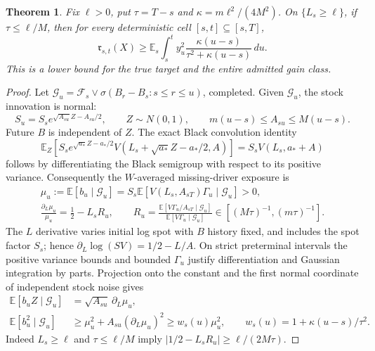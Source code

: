 \documentclass[11pt,a4paper]{amsart}
\theoremstyle{plain}
\newtheorem{theorem}{Theorem}[section]
\theoremstyle{definition}
\theoremstyle{remark}
\newcommand{\EE}{\mathbb{E}}
\newcommand{\F}{\mathcal F}
\newcommand{\G}{\mathcal G}
\newcommand{\Es}{\EE_s}
\begin{document}
\begin{theorem}\label{thm:direct}
Fix $\ell>0$, put $\tau=T-s$ and $\kappa=m\ell^2/(4M^2)$. On $\{L_s\ge\ell\}$, if $\tau\le\ell/M$, then for every deterministic cell $[s,t]\subseteq[s,T]$,
\begin{equation}\label{eq:direct-coercivity}
 \mathfrak r_{s,t}(X)\ge
 \Es\int_s^t y_u^2\frac{\kappa(u-s)}{\tau^2+\kappa(u-s)}\,du.
\end{equation}
This is a lower bound for the true target and the entire admitted gain class.
\end{theorem}
\begin{proof}
Let $\G_u=\F_s\vee\sigma(B_r-B_s:s\le r\le u)$, completed. Given $\G_u$, the stock innovation is normal:
\[
 S_u=S_s e^{\sqrt{A_{su}}Z-A_{su}/2},\qquad Z\sim N(0,1),
 \qquad m(u-s)\le A_{su}\le M(u-s).
\]
Future $B$ is independent of $Z$. The exact Black convolution identity
\begin{equation}\label{eq:black-semigroup}
 \EE_Z\!\left[S_s e^{\sqrt{a_*}Z-a_*/2}
 V(L_s+\sqrt{a_*}Z-a_*/2,A)\right]=S_sV(L_s,a_*+A)
\end{equation}
follows by differentiating the Black semigroup with respect to its positive variance. Consequently the $W$-averaged missing-driver exposure is
\begin{equation}\label{eq:mu-logderivative}
 \begin{gathered}
 \mu_u:=\EE[b_u\mid\G_u]
   =S_s\EE[V(L_s,A_{sT})\Gamma_u\mid\G_u]>0,\\
 \frac{\partial_L\mu_u}{\mu_u}=\tfrac12-L_sR_u,
 \qquad
 R_u=\frac{\EE[V\Gamma_u/A_{sT}\mid\G_u]}{
                  \EE[V\Gamma_u\mid\G_u]}
       \in[(M\tau)^{-1},(m\tau)^{-1}].
 \end{gathered}
\end{equation}
The $L$ derivative varies initial log spot with $B$ history fixed, and includes the spot factor $S_s$; hence $\partial_L\log(SV)=1/2-L/A$. On strict preterminal intervals the positive variance bounds and bounded $\Gamma_u$ justify differentiation and Gaussian integration by parts. Projection onto the constant and the first normal coordinate of independent stock noise gives
\begin{align*}
 \EE[b_uZ\mid\G_u]&=\sqrt{A_{su}}\,\partial_L\mu_u,\\
 \EE[b_u^2\mid\G_u]&\ge\mu_u^2+A_{su}(\partial_L\mu_u)^2
 \ge w_s(u)\mu_u^2,\qquad
 w_s(u)=1+\kappa(u-s)/\tau^2.
\end{align*}
Indeed $L_s\ge\ell$ and $\tau\le\ell/M$ imply
$|1/2-L_sR_u|\ge\ell/(2M\tau)$.


\end{proof}
\end{document}
